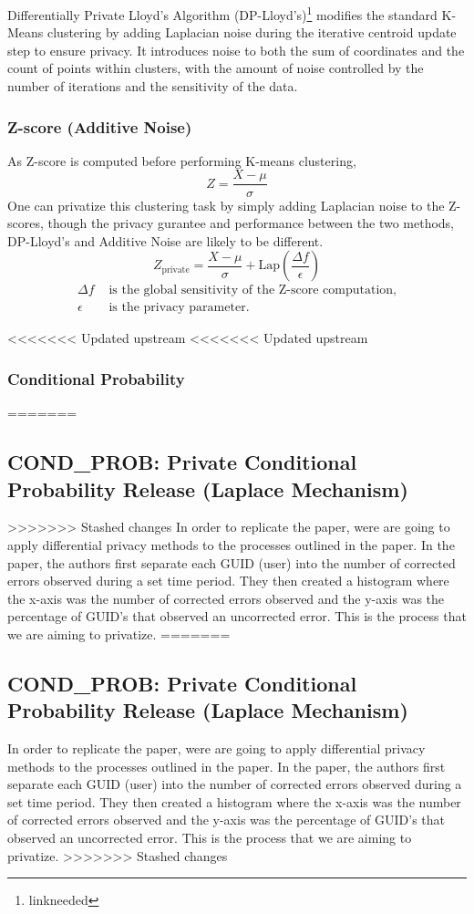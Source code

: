 \documentclass[12pt,letterpaper]{article}
\begin{document}
\begin{table}[h]
Differentially Private Lloyd's Algorithm (DP-Lloyd's)\footnote{linkneeded} modifies the standard K-Means clustering by adding Laplacian noise during the iterative centroid update step to ensure privacy. It introduces noise to both the sum of coordinates and the count of points within clusters, with the amount of noise controlled by the number of iterations and the sensitivity of the data. 

\subsubsection{Z-score (Additive Noise)}
As Z-score is computed before performing K-means clustering, 
\[
Z = \frac{X - \mu}{\sigma}
\]
One can privatize this clustering task by simply adding Laplacian noise to the Z-scores, though the privacy gurantee and performance between the two methods, DP-Lloyd's and Additive Noise are likely to be different.
\[
Z_{\text{private}} = \frac{X - \mu}{\sigma} + \text{Lap}\left(\frac{\Delta f}{\epsilon}\right)
\]
\begin{equation*}
\begin{aligned}
    \Delta f & \text{ is the global sensitivity of the Z-score computation,} \\
    \epsilon & \text{ is the privacy parameter.}
\end{aligned}
\end{equation*}



<<<<<<< Updated upstream
<<<<<<< Updated upstream
\subsubsection{Conditional Probability}
=======
\subsection{COND\_PROB: Private Conditional Probability Release (Laplace Mechanism)}
>>>>>>> Stashed changes
In order to replicate the paper, were are going to apply differential privacy methods to the processes outlined in the paper. In the paper, the authors first separate each GUID (user) into the number of corrected errors observed during a set time period. They then created a histogram where the x-axis was the number of corrected errors observed and the y-axis was the percentage of GUID's that observed an uncorrected error. This is the process that we are aiming to privatize. 
=======
\subsection{COND\_PROB: Private Conditional Probability Release (Laplace Mechanism)}
In order to replicate the paper, were are going to apply differential privacy methods to the processes outlined in the paper. In the paper, the authors first separate each GUID (user) into the number of corrected errors observed during a set time period. They then created a histogram where the x-axis was the number of corrected errors observed and the y-axis was the percentage of GUID's that observed an uncorrected error.\cite{Kwasnick2023} This is the process that we are aiming to privatize. 
>>>>>>> Stashed changes


\end{table}
\end{document}
